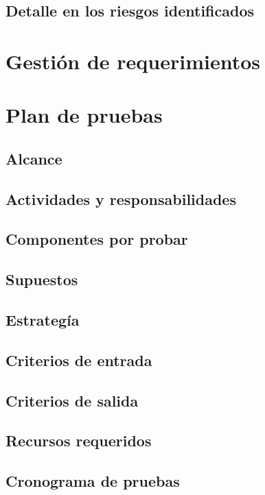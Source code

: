\subsection{Detalle en los riesgos identificados}
\label{subsection:riesgos:detalle}

\section{Gestión de requerimientos}
\label{section:gestion}

\section{Plan de pruebas}
\label{section:plan-pruebas}

\subsection{Alcance}
\label{subsection:plan-pruebas:alcance}

\subsection{Actividades y responsabilidades}
\label{subsection:plan-pruebas:responsabilidades}

\subsection{Componentes por probar}
\label{subsection:plan-pruebas:componentes}

\subsection{Supuestos}
\label{subsection:plan-pruebas:supuestos}

\subsection{Estrategía}
\label{subsection:plan-pruebas:estrategia}

\subsection{Criterios de entrada}
\label{subsection:plan-pruebas:criterios-entrada}

\subsection{Criterios de salida}
\label{subsection:plan-pruebas:criterios-salida}

\subsection{Recursos requeridos}
\label{subsection:plan-pruebas:recursos}

\subsection{Cronograma de pruebas}
\label{subsection:plan-section:cronograma}

